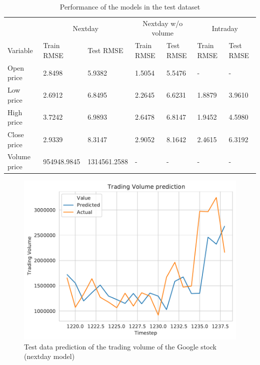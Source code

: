 \documentclass[10pt,twocolumn,letterpaper]{article}
\begin{document}
\begin{table}[h]
	\begin{center}
		\begin{tabular}{|p{1.8cm}|p{2cm}|p{2cm}|p{1.8cm}|p{1.8cm}|p{1.8cm}|p{1.8cm}|}
			\hline
			& \multicolumn{2}{c}{Nextday} & \multicolumn{2}{c}{Nextday w/o volume} & \multicolumn{2}{c}{Intraday} \\
			Variable & Train RMSE & Test RMSE & Train RMSE & Test RMSE & Train RMSE & Test RMSE \\
			\hline\hline
			Open price & 2.8498 & 5.9382 & 1.5054 & 5.5476 & - & - \\
			Low price & 2.6912 & 6.8495 & 2.2645 & 6.6231 & 1.8879 & 3.9610\\
			High price & 3.7242 & 6.9893 & 2.6478 & 6.8147 & 1.9452 & 4.5980 \\
			Close price & 2.9339 & 8.3147 & 2.9052 & 8.1642 & 2.4615 & 6.3192 \\
			Volume price & 954948.9845 & 1314561.2588 & - & - & - & - \\
			\hline
		\end{tabular}
	\end{center}
	\caption{Performance of the models in the test dataset}
	\label{table:error}
\end{table}

\begin{figure}[h]
	\begin{center}
		\includegraphics[width=1.0\linewidth]{prediction_volume.pdf}
	\end{center}
	\caption{Test data prediction of the trading volume of the Google stock (nextday model)}
	\label{fig:volume_pred}
\end{figure}
\end{document}

